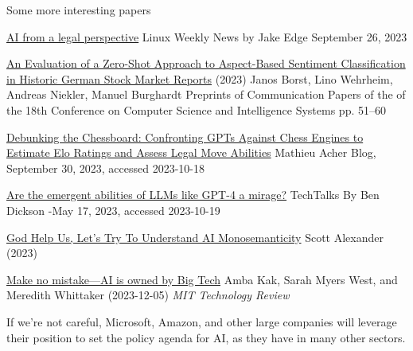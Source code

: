 \documentclass{beamer}
\begin{document}
\begin{frame}{Some more interesting papers}


\href{https://lwn.net/Articles/945504/}{AI from a legal perspective} Linux Weekly News by Jake Edge September 26, 2023


\href{https://annals-csis.org/proceedings/2023/pliks/3725.pdf}{An Evaluation of a Zero-Shot Approach to
Aspect-Based Sentiment Classification in Historic
German Stock Market Reports} (2023) Janos Borst, Lino Wehrheim, Andreas Niekler, Manuel Burghardt
Preprints of Communication Papers of the of the 18th Conference on Computer
Science and Intelligence Systems pp. 51–60

\href{https://blog.mathieuacher.com/GPTsChessEloRatingLegalMoves/}{Debunking the Chessboard: Confronting GPTs Against Chess Engines to Estimate Elo Ratings and Assess Legal Move Abilities} 
Mathieu Acher Blog, September 30, 2023, accessed 2023-10-18

\href{https://bdtechtalks.com/2023/05/17/llm-emergent-abilities-mirage/}{Are the emergent abilities of LLMs like GPT-4 a mirage?} TechTalks
By Ben Dickson -May 17, 2023, accessed 2023-10-19

\href{https://www.astralcodexten.com/p/god-help-us-lets-try-to-understand}{God Help Us, Let's Try To Understand AI Monosemanticity} Scott Alexander (2023)

\href{https://www.technologyreview.com/2023/12/05/1084393/make-no-mistake-ai-is-owned-by-big-tech/amp/}{Make no mistake—AI is owned by Big Tech}  Amba Kak, Sarah Myers West, and Meredith Whittaker (2023-12-05) \textit{MIT Technology Review}

If we’re not careful, Microsoft, Amazon, and other large companies will leverage their position to set the policy agenda for AI, as they have in many other sectors.
\end{frame}



\end{document}
